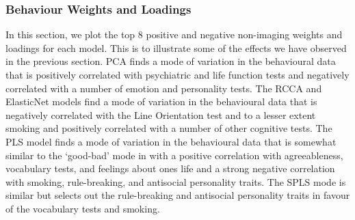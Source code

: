 \subsubsection{Behaviour Weights and Loadings}

In this section, we plot the top 8 positive and negative non-imaging weights and loadings for each model.
This is to illustrate some of the effects we have observed in the previous section.
PCA finds a mode of variation in the behavioural data that is positively correlated with psychiatric and life function tests and negatively correlated with a number of emotion and personality tests.
The RCCA and ElasticNet models find a mode of variation in the behavioural data that is negatively correlated with the Line Orientation test and to a lesser extent smoking and positively correlated with a number of other cognitive tests.
The PLS model finds a mode of variation in the behavioural data that is somewhat similar to the `good-bad' mode in \cite{smith2015positive} with a positive correlation with agreeableness, vocabulary tests, and feelings about ones life and a strong negative correlation with smoking, rule-breaking, and antisocial personality traits.
The SPLS mode is similar but selects out the rule-breaking and antisocial personality traits in favour of the vocabulary tests and smoking.

